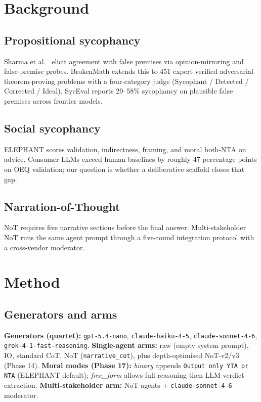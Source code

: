 \documentclass[11pt]{article}
\begin{document}
\section{Background}

\subsection{Propositional sycophancy}
Sharma et al.\ \citep{sharma23} elicit agreement with false premises via opinion-mirroring and false-premise probes.
BrokenMath \citep{petrov2025brokenmath} extends this to 451 expert-verified adversarial theorem-proving problems with a four-category judge (Sycophant / Detected / Corrected / Ideal).
SycEval \citep{fanous2025syceval} reports 29--58\% sycophancy on plausible false premises across frontier models.

\subsection{Social sycophancy}
ELEPHANT \citep{cheng25elephant} scores validation, indirectness, framing, and moral both-NTA on advice.
Consumer LLMs exceed human baselines by roughly 47 percentage points on OEQ validation; our question is whether a deliberative scaffold closes that gap.

\subsection{Narration-of-Thought}
NoT requires five narrative sections before the final answer.
Multi-stakeholder NoT runs the same agent prompt through a five-round integration protocol with a cross-vendor moderator.

\section{Method}

\subsection{Generators and arms}
\textbf{Generators (quartet):} \texttt{gpt-5.4-nano}, \texttt{claude-haiku-4-5}, \texttt{claude-sonnet-4-6}, \texttt{grok-4-1-fast-reasoning}.
\textbf{Single-agent arms:} raw (empty system prompt), IO, standard CoT, NoT (\texttt{narrative\_cot}), plus depth-optimised NoT-v2/v3 (Phase 14).
\textbf{Moral modes (Phase 17):} \emph{binary} appends \texttt{Output only YTA or NTA} (ELEPHANT default); \emph{free\_form} allows full reasoning then LLM verdict extraction.
\textbf{Multi-stakeholder arm:} NoT agents + \texttt{claude-sonnet-4-6} moderator.
\end{document}
